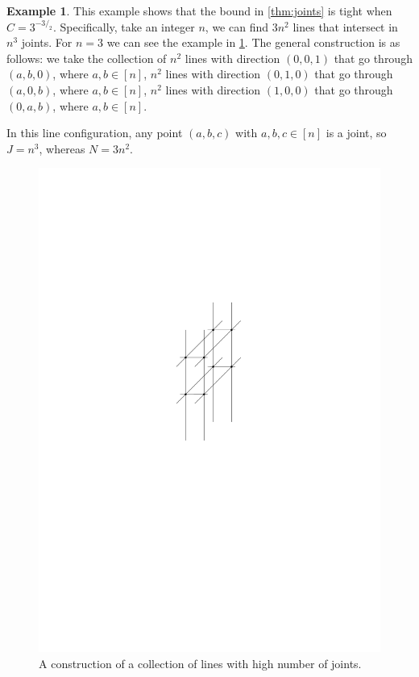 \documentclass[12pt]{amsart}
\theoremstyle{definition}
\newtheorem{smpl}[thm]{Example}
\begin{document}
\begin{smpl}
This example shows that the bound in \cref{thm:joints} is tight when $C = 3^{-3/_2}$.
Specifically, take an integer $n$, we can find $3n^2$ lines that intersect in $n^3$ joints. 
For $n=3$ we can see the example in \cref{fig:joints}.
The general construction is as follows: we take the collection of $n^2$ lines with direction $(0, 0, 1)$ that go through $(a, b, 0)$, where $a, b\in [n]$, $n^2$ lines with direction $(0, 1, 0)$ that go through $(a, 0, b)$, where $a, b\in [n]$, $n^2$ lines with direction $(1, 0, 0)$ that go through $(0, a, b)$, where $a, b\in [n]$.

In this line configuration, any point $(a, b, c) $ with $a, b, c \in [n]$ is a joint, so $J = n^3$, whereas $N = 3 n^2$.

\begin{figure}[h]
\includegraphics[scale=.6]{../imgs/joints_problem}%
\caption{A construction of a collection of lines with high number of joints.\label{fig:joints}}
\end{figure}
\end{smpl}
\end{document}
